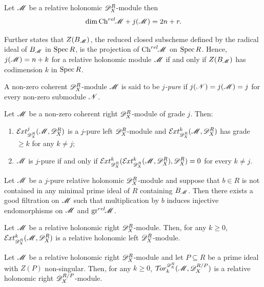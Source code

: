 \begin{proposition}{\cite[Lemma 3.4.1]{budur2020zeroI}}\label{prop: ChrelGrades}
  Let $\mathscr{M}$ be a relative holonomic $\mathscr{D}_X^R$-module then
  $$\dim \operatorname{Ch}^{rel}\mkern-5mu \mathscr{M} + j(\mathscr{M}) = 2n + r.$$
\end{proposition}
\begin{remark}\label{rem: GradeIFFBernsteinIdeal}
  Further \cite[Lemma 3.2.2]{budur2020zeroI} states that $Z(B_{\mathscr{M}})$, the reduced closed subscheme defined by the radical ideal of $B_{\mathscr{M}}$ in $\operatorname{Spec} R$, is the projection of $\operatorname{Ch}^{rel}\mkern-5mu\mathscr{M}$ on $\operatorname{Spec} R$.
  Hence, $j(\mathscr{M})=n+k$ for a relative holonomic module $\mathscr{M}$ if and only if $Z(B_{\mathscr{M}})$  has codimension $k$ in $\operatorname{Spec} R$.
  \end{remark}
\begin{definition}
  A non-zero coherent $\mathscr{D}_X^R$-module $\mathscr{M}$ is said to be {\it $j$-pure} if $j(\mathscr{N}) = j(\mathscr{M}) = j$ for every non-zero submodule $\mathscr{N}$.
\end{definition}
\begin{proposition}{\cite[Lemma 4.3.5.]{budur2020zeroI}}\label{prop: JPureExt}
   Let $\mathscr{M}$ be a non-zero coherent right $\mathscr{D}_X^R$-module of grade $j$. Then:
\begin{enumerate}
\item    $\Ex{\D_X^R}{j}(\M,\D_X^R)$ is a $j$-pure left $\mathscr{D}_X^R$-module and $\Ex{\D_X^R}{k}(\M,\D_X^R)$ has grade $\ge k$ for any $k\neq j$;
\item $\mathscr{M}$ is $j$-pure if and only if $\Ex{\D_X^R}{k}(\Ex{\D_X^R}{k}(\M,\D_X^R),\D_X^R)= 0$ for every $k\neq j$.
\end{enumerate}
 \end{proposition}
 \begin{proposition}{\cite[Lemma 3.4.2]{budur2020zeroI}}\label{prop: Injective3.4.2}
   Let $\mathscr{M}$ be a $j$-pure relative holonomic $\mathscr{D}_X^R$-module and suppose that $b\in R$ is not contained in any minimal prime ideal of $R$ containing $B_{\mathscr{M}}$.
   Then there exists a good filtration on $\mathscr{M}$ such that multiplication by $b$ induces injective endomorphisms on $\mathscr{M}$ and $\operatorname{gr}^{rel}\mkern-5mu\mathscr{M}$.
 \end{proposition}
 \begin{proposition}{\cite[Lemma 3.2.4.]{budur2020zeroI}}
   Let $\mathscr{M}$ be a relative holonomic right $\mathscr{D}_X^R$-module.
   Then, for any $k\geq 0$, $\Ex{\D_X^R}{k}(\M,\D_X^R)$ is a relative holonomic left $\mathscr{D}_X^R$-module.
 \end{proposition}
 \begin{proposition}\label{prop: TorRelHol}
   Let $\mathscr{M}$ be a relative holonomic right $\mathscr{D}_X^R$-module and let $P\subseteq R$ be a prime ideal with $Z(P)$ non-singular.
   Then, for any $k\geq 0$, $\Tr{\D_X^R}{k}(\M,\D_X^{R/P})$ is a relative holonomic right $\mathscr{D}_X^{R/P}$-module.
 \end{proposition}
